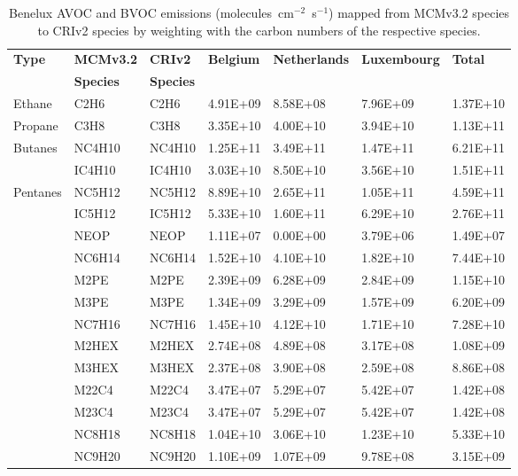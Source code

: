 \footnotesize
\begin{longtable}{lllllll}
	\caption{Benelux AVOC and BVOC emissions (molecules~cm$^{-2}$~s$^{-1}$) mapped from MCMv3.2 species to CRIv2 species by weighting with the carbon numbers of the respective species.}\\%
	\hline \hline
	\multirow{2}{*}{\textbf{Type}} & \textbf{MCMv3.2} & \textbf{CRIv2} & \multirow{2}{*}{\textbf{Belgium}} & \multirow{2}{*}{\textbf{Netherlands}} & \multirow{2}{*}{\textbf{Luxembourg}} & \multirow{2}{*}{\textbf{Total}} \\
 & \textbf{Species} & \textbf{Species} & & & & \\
	\endhead
	\hline
	Ethane & C2H6 & C2H6 & 4.91E+09 & 8.58E+08 & 7.96E+09 & 1.37E+10 \\
	\hline Propane & C3H8 & C3H8 & 3.35E+10 & 4.00E+10 & 3.94E+10 & 1.13E+11 \\ \hline
	\multirow{2}{*}{Butanes} & NC4H10 & NC4H10 & 1.25E+11 & 3.49E+11 & 1.47E+11 & 6.21E+11 \\
	 & IC4H10 & IC4H10 & 3.03E+10 & 8.50E+10 & 3.56E+10 & 1.51E+11 \\
	\hline \multirow{3}{*}{Pentanes} & NC5H12 & NC5H12 & 8.89E+10 & 2.65E+11 & 1.05E+11 & 4.59E+11 \\
	 & IC5H12 & IC5H12 & 5.33E+10 & 1.60E+11 & 6.29E+10 & 2.76E+11 \\
	 & NEOP & NEOP & 1.11E+07 & 0.00E+00 & 3.79E+06 & 1.49E+07 \\
	\hline \parbox[t]{2mm}{} & NC6H14 & NC6H14 & 1.52E+10 & 4.10E+10 & 1.82E+10 & 7.44E+10 \\
	 & M2PE & M2PE & 2.39E+09 & 6.28E+09 & 2.84E+09 & 1.15E+10 \\
	 & M3PE & M3PE & 1.34E+09 & 3.29E+09 & 1.57E+09 & 6.20E+09 \\
	 & NC7H16 & NC7H16 & 1.45E+10 & 4.12E+10 & 1.71E+10 & 7.28E+10 \\
	 & M2HEX & M2HEX & 2.74E+08 & 4.89E+08 & 3.17E+08 & 1.08E+09 \\
	 & M3HEX & M3HEX & 2.37E+08 & 3.90E+08 & 2.59E+08 & 8.86E+08 \\
	 & M22C4 & M22C4 & 3.47E+07 & 5.29E+07 & 5.42E+07 & 1.42E+08 \\
	 & M23C4 & M23C4 & 3.47E+07 & 5.29E+07 & 5.42E+07 & 1.42E+08 \\
	 & NC8H18 & NC8H18 & 1.04E+10 & 3.06E+10 & 1.23E+10 & 5.33E+10 \\
	 & NC9H20 & NC9H20 & 1.10E+09 & 1.07E+09 & 9.78E+08 & 3.15E+09 \\

\end{longtable}
